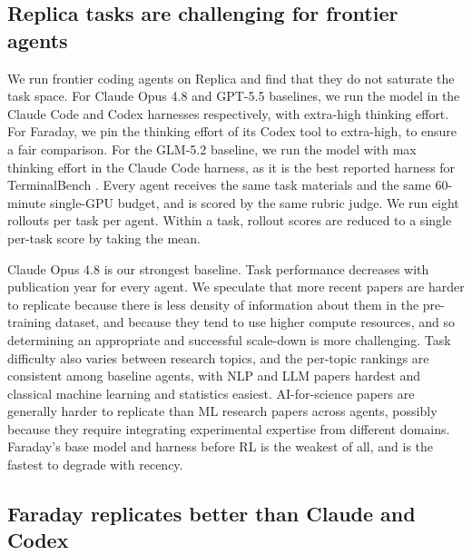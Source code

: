 \documentclass[garamond,a4paper]{inherent}
\newcommand{\faradayname}{Faraday\xspace}
\newcommand{\replicaname}{Replica\xspace}
\begin{document}
\subsection{\replicaname tasks are challenging for frontier agents}
\label{sec:baselines}
We run frontier coding agents on Replica and find that they do not saturate the task space. For Claude Opus 4.8 and GPT-5.5 baselines, we run the model in the Claude Code and Codex harnesses respectively, with extra-high thinking effort. For Faraday, we pin the thinking effort of its Codex tool to extra-high, to ensure a fair comparison. For the GLM-5.2 baseline, we run the model with max thinking effort in the Claude Code harness, as it is the best reported harness for TerminalBench \citep{zai2026glm52}. Every agent receives the same task materials and the same $60$-minute single-GPU budget, and is scored by the same rubric judge. We run eight rollouts per task per agent.
Within a task, rollout scores are reduced to a single per-task score by taking the mean.

Claude Opus 4.8 is our strongest baseline. Task performance decreases with publication year for every agent. We speculate that more recent papers are harder to replicate because there is less density of information about them in the pre-training dataset, and because they tend to use higher compute resources, and so determining an appropriate and successful scale-down is more challenging. Task difficulty also varies between research topics, and the per-topic rankings are consistent among baseline agents, with NLP and LLM papers hardest and classical machine learning and statistics easiest. AI-for-science papers are generally harder to replicate than ML research papers across agents, possibly because they require integrating experimental expertise from different domains. Faraday's base model and harness before RL is the weakest of all, and is the fastest to degrade with recency. 

\subsection{\faradayname replicates better than Claude and Codex}\label{sec:results_quantitative}
\end{document}

